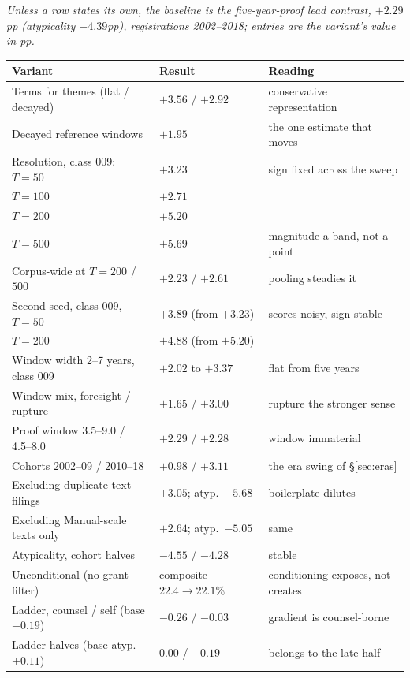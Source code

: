 \begin{center}\small
\emph{Unless a row states its own, the baseline is the five-year-proof
lead contrast, $+2.29$pp (atypicality $-4.39$pp), registrations
2002--2018; entries are the variant's value in pp.}\\[0.4em]
\begin{tabular}{lll}
\toprule
Variant & Result & Reading \\
\midrule
Terms for themes (flat / decayed) & $+3.56$ / $+2.92$ & conservative representation \\
Decayed reference windows & $+1.95$ & the one estimate that moves \\
Resolution, class 009: $T = 50$ & $+3.23$ & sign fixed across the sweep \\
\quad $T = 100$ & $+2.71$ & \\
\quad $T = 200$ & $+5.20$ & \\
\quad $T = 500$ & $+5.69$ & magnitude a band, not a point \\
Corpus-wide at $T = 200$ / $500$ & $+2.23$ / $+2.61$ & pooling steadies it \\
Second seed, class 009, $T = 50$ & $+3.89$ (from $+3.23$) & scores noisy, sign stable \\
\quad $T = 200$ & $+4.88$ (from $+5.20$) & \\
Window width 2--7 years, class 009 & $+2.02$ to $+3.37$ & flat from five years \\
Window mix, foresight / rupture & $+1.65$ / $+3.00$ & rupture the stronger sense \\
Proof window 3.5--9.0 / 4.5--8.0 & $+2.29$ / $+2.28$ & window immaterial \\
Cohorts 2002--09 / 2010--18 & $+0.98$ / $+3.11$ & the era swing of \S\ref{sec:eras} \\
Excluding duplicate-text filings & $+3.05$; atyp.\ $-5.68$ & boilerplate dilutes \\
Excluding Manual-scale texts only & $+2.64$; atyp.\ $-5.05$ & same \\
Atypicality, cohort halves & $-4.55$ / $-4.28$ & stable \\
Unconditional (no grant filter) & composite $22.4 \to 22.1$\% & conditioning exposes, not creates \\
Ladder, counsel / self (base $-0.19$) & $-0.26$ / $-0.03$ & gradient is counsel-borne \\
Ladder halves (base atyp.\ $+0.11$) & $0.00$ / $+0.19$ & belongs to the late half \\
\bottomrule
\end{tabular}
\end{center}

